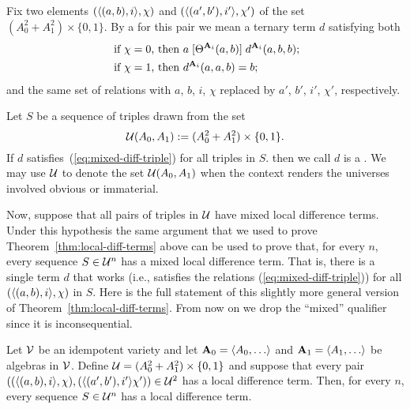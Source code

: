 Fix two elements $(\langle(a, b),i\rangle, \chi)$ and $(\langle(a', b'),i'\rangle, \chi')$ of the
set $(A_0^2 + A_1^2) \times \{0,1\}$.
By a  for this pair
we mean a ternary term $d$ satisfying both
\begin{align}
\text{ if $\chi=0$, then } & a \Comr{\Cg^{\bA_i}(a,b)} d^{\bA_i}(a,b,b); \label{eq:mixed-diff-triple}\\
\text{ if $\chi=1$, then } &d^{\bA_i}(a,a,b) = b; \nonumber
\end{align}
and the same set of relations with $a$, $b$, $i$, $\chi$ replaced 
by $a'$, $b'$, $i'$, $\chi'$, respectively.

Let $S$ be a sequence of triples drawn from the set
\[
\mathcal{U}(A_0, A_1)  := (A_0^2 + A_1^2) \times \{0,1\}.
\]
If $d$ satisfies~(\ref{eq:mixed-diff-triple}) for all triples in $S$.
then we call $d$ is a .
We may use $\mathcal{U}$ to denote the set $\mathcal{U}(A_0, A_1)$ when the context renders the
universes involved obvious or immaterial.

Now, suppose that all pairs of triples 
in $\mathcal{U}$ have mixed local difference terms.
Under this hypothesis the same argument that we used to prove
Theorem~\ref{thm:local-diff-terms} above can be used to prove that, for every $n$,
every sequence $S\in \mathcal{U}^n$ has a mixed local difference term.
That is, there is a single term $d$ that works (i.e., satisfies
the relations (\ref{eq:mixed-diff-triple})) for all $(\langle(a, b), i\rangle,\chi)$ in $S$.
Here is the full statement of this slightly more general version of
Theorem~\ref{thm:local-diff-terms}.
From now on we drop the ``mixed'' qualifier since
it is inconsequential.

\begin{thm} %
  \label{thm:mixed-local-diff-terms}
  Let $\mathcal{V}$ be an idempotent variety and let
  $\bA_0 = \<A_0, \dots\>$ and   $\bA_1 = \<A_1, \dots\>$ be algebras in $\mathcal{V}$. Define
  $\mathcal{U}  = (A_0^2 + A_1^2)\times \{0,1\}$
  and suppose that every pair
  $((\langle(a, b), i\rangle, \chi), (\langle(a', b'), i'\rangle\chi')) \in \mathcal{U}^2$
  has a local difference term. Then, for every $n$, every sequence $S \in \mathcal{U}^n$
  has a local difference term.
\end{thm}

